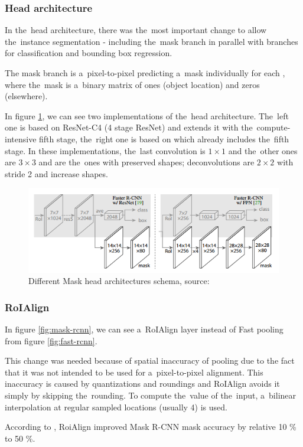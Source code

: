 \subsubsection{Head architecture}
\label{head}

In the~head architecture, there was the~most important change to allow
the~instance segmentation - including the~mask branch in parallel with branches for 
classification and bounding box regression. 

The mask branch is a~pixel-to-pixel  predicting a~mask individually for 
each , where the~mask is a~binary matrix of ones (object location) and zeros 
(elsewhere).

In figure \ref{fig:head}, we can see two implementations of the~head 
architecture. The~left one is based on ResNet-C4 (4 stage ResNet) and extends it 
with the~compute-intensive fifth stage, the~right one is based on  which 
already includes the~fifth stage. In these implementations, the~last convolution 
is $1 \times 1$ and the~other ones are $3 \times 3$ and are the~ones with 
preserved shapes; deconvolutions are $2 \times 2$ with stride 2 and increase 
shapes. 

\begin{figure}[H]
   \centering
	\includegraphics[width=0.7\linewidth]{./pictures/maskrcnn-head.png}
	\caption[Mask R-CNN head architecture]{Different Mask  head 
architectures schema, source: \cite{mask-rcnn}}
      \label{fig:head}
\end{figure}

\subsubsection{RoIAlign}
\label{roialign}

In figure \ref{fig:mask-rcnn}, we can see a~RoIAlign layer instead of Fast 
  pooling from figure \ref{fig:fast-rcnn}.

This change was needed because of spatial inaccuracy of  pooling due to 
the fact that it was not intended to be used for a~pixel-to-pixel alignment. 
This inaccuracy is caused by quantizations and roundings and RoIAlign avoids it 
simply by skipping the~rounding. To compute the~value of the~input, a~bilinear 
interpolation at regular sampled locations (usually 4) is used.

According to \cite{mask-rcnn}, RoiAlign improved Mask R-CNN mask accuracy by 
relative 10 \% to 50 \%.

